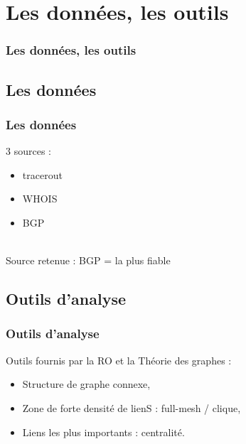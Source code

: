 \section{Les donn\'ees, les outils}

\begin{frame}
 	\frametitle{Les donn\'ees, les outils}
\end{frame}

\subsection{Les donn\'ees}
\frame
{
\frametitle{Les donn\'ees}
3 sources : \\
\begin{itemize}
 \item tracerout
 \item WHOIS
 \item BGP
\end{itemize}
~\\
Source retenue : BGP = la plus fiable
}

\subsection{Outils d'analyse}
\frame
{
\frametitle{Outils d'analyse}
Outils fournis par la RO et la Th\'eorie des graphes : \\
\begin{itemize}
 \item Structure de graphe connexe,
 \item Zone de forte densit\'e de lienS : full-mesh / clique,
 \item Liens les plus importants : centralit\'e.
\end{itemize}
}

